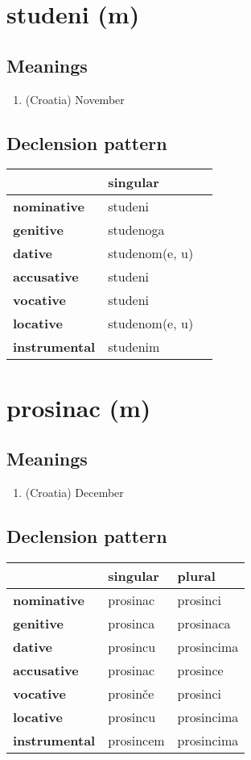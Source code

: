 \filbreak
\section{studeni (m)}
\subsection*{Meanings}
\begin{enumerate}
\item (Croatia) November
\end{enumerate}
\subsection*{Declension pattern}
\begin{tabularx}{\linewidth}{Xll}
\toprule
{} &        singular \\
\midrule
\textbf{nominative  } &         studeni \\
\textbf{genitive    } &       studenoga \\
\textbf{dative      } &  studenom(e, u) \\
\textbf{accusative  } &         studeni \\
\textbf{vocative    } &         studeni \\
\textbf{locative    } &  studenom(e, u) \\
\textbf{instrumental} &        studenim \\
\bottomrule
\end{tabularx}

\filbreak
\section{prosinac (m)}
\subsection*{Meanings}
\begin{enumerate}
\item (Croatia) December
\end{enumerate}
\subsection*{Declension pattern}
\begin{tabularx}{\linewidth}{Xll}
\toprule
{} &   singular &      plural \\
\midrule
\textbf{nominative  } &   prosinac &    prosinci \\
\textbf{genitive    } &   prosinca &   prosinaca \\
\textbf{dative      } &   prosincu &  prosincima \\
\textbf{accusative  } &   prosinac &    prosince \\
\textbf{vocative    } &   prosinče &    prosinci \\
\textbf{locative    } &   prosincu &  prosincima \\
\textbf{instrumental} &  prosincem &  prosincima \\
\bottomrule
\end{tabularx}

